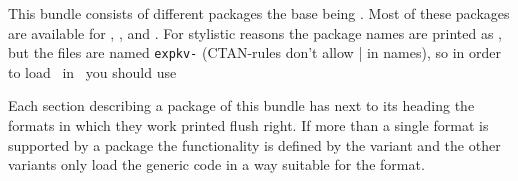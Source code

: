 
This bundle consists of different packages the base being \expkv. Most of these
packages are available for , \LaTeXe, and . For
stylistic reasons the package names are printed as
, but the files are named
\texttt{expkv-} (CTAN-rules don't allow \string| in names), so in
order to load \expkvc\ in \LaTeXe\ you should use
\begin{enverb}[no-tcb]
  \usepackage{expkv-cs}
\end{enverb}
Each section describing a package of this bundle has next to its heading the
formats in which they work printed flush right. If more than a single format is
supported by a package the functionality is defined by the 
variant and the other variants only load the generic code in a way suitable for
the format.

